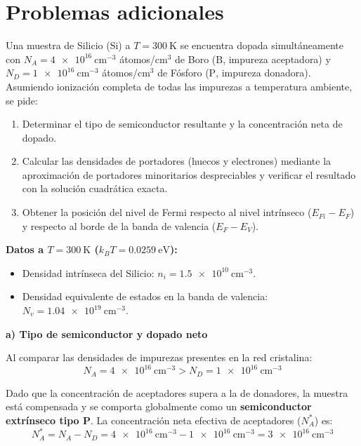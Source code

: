 \section{Problemas adicionales}
\setcounter{problemacontador}{1}
\begin{problema}
Una muestra de Silicio ($\text{Si}$) a $T = \SI{300}{\kelvin}$ se encuentra dopada simultáneamente con $N_A = \SI{4e16}{\cm^{-3}}$ átomos/cm$^3$ de Boro ($\text{B}$, impureza aceptadora) y $N_D = \SI{1e16}{\cm^{-3}}$ átomos/cm$^3$ de Fósforo ($\text{P}$, impureza donadora). Asumiendo ionización completa de todas las impurezas a temperatura ambiente, se pide:
\begin{enumerate}[label=\alph*)]
    \item Determinar el tipo de semiconductor resultante y la concentración neta de dopado.
    \item Calcular las densidades de portadores (huecos y electrones) mediante la aproximación de portadores minoritarios despreciables y verificar el resultado con la solución cuadrática exacta.
    \item Obtener la posición del nivel de Fermi respecto al nivel intrínseco ($E_{Fi} - E_F$) y respecto al borde de la banda de valencia ($E_F - E_V$).
\end{enumerate}

\textbf{Datos a $T = \SI{300}{\kelvin}$ ($k_B T = \SI{0.0259}{\eV}$):}
\begin{itemize}
    \item Densidad intrínseca del Silicio: $n_i = \SI{1.5e10}{\cm^{-3}}$.
    \item Densidad equivalente de estados en la banda de valencia: $N_v = \SI{1.04e19}{\cm^{-3}}$.
\end{itemize}

\tcblower

\textbf{a) Tipo de semiconductor y dopado neto}

Al comparar las densidades de impurezas presentes en la red cristalina:
\[
N_A = \SI{4e16}{\cm^{-3}} > N_D = \SI{1e16}{\cm^{-3}}
\]

Dado que la concentración de aceptadores supera a la de donadores, la muestra está compensada y se comporta globalmente como un \textbf{semiconductor extrínseco tipo P}. La concentración neta efectiva de aceptadores ($N_A^*$) es:
\[
N_A^* = N_A - N_D = \SI{4e16}{\cm^{-3}} - \SI{1e16}{\cm^{-3}} = \SI{3e16}{\cm^{-3}}
\]


\end{problema}
